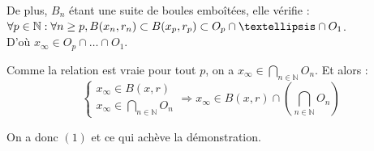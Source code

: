 \documentclass[10pt,a4paper]{article}
\begin{document}
De plus, $B_n$ étant une suite de boules emboîtées, elle vérifie :\\
$\forall p \in \mathbb{N} : \\ \forall n \geq p, B(x_n, r_n) \subset B(x_p, r_p) \subset O_p \cap … \cap O_1 $. \\
D'où $x_\infty \in O_p \cap … \cap O_1$.

Comme la relation est vraie pour tout $p$, on a $x_\infty \in \bigcap_{n \in \mathbb{N}} O_n$. Et alors :\\
\begin{equation*}
\left\{\begin{array}{l}
x_\infty \in B(x, r) \\
x_\infty \in \bigcap_{n \in \mathbb{N}} O_n
\end{array}\right . \Longrightarrow 
x_\infty \in B(x,r) \cap (\bigcap_{n \in \mathbb{N}} O_n)
\end{equation*}

On a donc $(1)$ et ce qui achève la démonstration.
\end{document}
